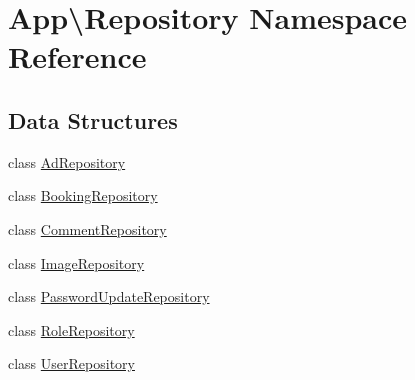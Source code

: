 \hypertarget{namespace_app_1_1_repository}{}\section{App\textbackslash{}Repository Namespace Reference}
\label{namespace_app_1_1_repository}
\subsection*{Data Structures}
\begin{DoxyCompactItemize}
\item 
class \mbox{\hyperlink{class_app_1_1_repository_1_1_ad_repository}{Ad\+Repository}}
\item 
class \mbox{\hyperlink{class_app_1_1_repository_1_1_booking_repository}{Booking\+Repository}}
\item 
class \mbox{\hyperlink{class_app_1_1_repository_1_1_comment_repository}{Comment\+Repository}}
\item 
class \mbox{\hyperlink{class_app_1_1_repository_1_1_image_repository}{Image\+Repository}}
\item 
class \mbox{\hyperlink{class_app_1_1_repository_1_1_password_update_repository}{Password\+Update\+Repository}}
\item 
class \mbox{\hyperlink{class_app_1_1_repository_1_1_role_repository}{Role\+Repository}}
\item 
class \mbox{\hyperlink{class_app_1_1_repository_1_1_user_repository}{User\+Repository}}
\end{DoxyCompactItemize}
